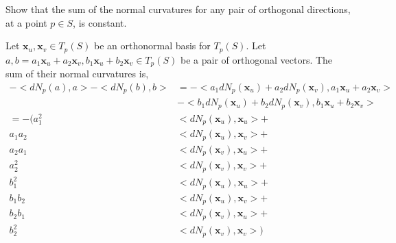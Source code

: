 \documentclass[12pt,letterpaper]{hmcpset}
\begin{document}
\newpage
\begin{problem}
\\ \\
Show that the sum of the normal curvatures for any pair of orthogonal directions, at a point $p\in S$, is constant.
\end{problem}
\begin{solution}
 Let $\mathbf{x}_u, \mathbf{x}_v \in T_p(S)$ be an orthonormal basis for $T_p(S)$.
Let $a, b = a_1\mathbf{x}_u + a_2\mathbf{x}_v, b_1\mathbf{x}_u + b_2\mathbf{x}_v
\in T_p(S)$ be a pair of orthogonal vectors.
The sum of their normal curvatures
is, \\
\begin{align*}
  -<dN_p(a), a> - <dN_p(b), b> &= -<a_1dN_p(\mathbf{x}_u) + a_2
                                 dN_p(\mathbf{x}_v), a_1\mathbf{x}_u + a_2\mathbf{x}_v> \\
                               & -<b_1dN_p(\mathbf{x}_u) + b_2
                                 dN_p(\mathbf{x}_v), b_1\mathbf{x}_u + b_2\mathbf{x}_v> \\
                               = -(a_1^2&<dN_p(\mathbf{x}_u), \mathbf{x}_u> + \\
                                 a_1a_2&<dN_p(\mathbf{x}_u), \mathbf{x}_v> + \\
                                 a_2a_1&<dN_p(\mathbf{x}_v), \mathbf{x}_u> + \\
                                 a_2^2 &<dN_p(\mathbf{x}_v), \mathbf{x}_v> + \\
                                 b_1^2 &<dN_p(\mathbf{x}_u), \mathbf{x}_u> + \\
                                 b_1b_2&<dN_p(\mathbf{x}_u), \mathbf{x}_v> + \\
                                 b_2b_1&<dN_p(\mathbf{x}_v), \mathbf{x}_u> + \\
                                 b_2^2 &<dN_p(\mathbf{x}_v), \mathbf{x}_v>
                                         ) \\

\end{align*}
\end{solution}
\end{document}
